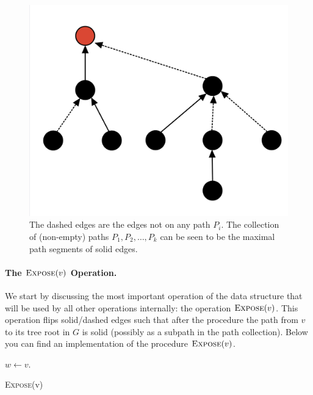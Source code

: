 \begin{figure}[!ht]
    \centering
    \includegraphics[scale=0.20]{./fig/HeavyLightDecomposition_lectureDynamicTree.jpeg}
    \caption{The dashed edges are the edges not on any path $P_i$. The collection of (non-empty) paths $P_1, P_2, \dots, P_k$ can be seen to be the maximal path segments of solid edges.}
\end{figure}

\paragraph{The $\textsc{Expose}(v)$ Operation.} We start by discussing the most important operation of the data structure that will be used by all other operations internally: the operation $\textsc{Expose}(v)$. This operation flips solid/dashed edges such that after the procedure the path from $v$ to its tree root in $G$ is solid (possibly as a subpath in the path collection). Below you can find an implementation of the procedure $\textsc{Expose}(v)$. 

\begin{algorithm}
  \SetAlgoLined
  $w \gets v$.\\
  \caption{\textsc{Expose}(v)}
\end{algorithm}

